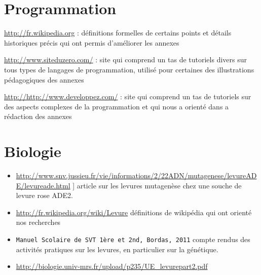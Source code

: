 \label{BibSito}
\section*{Programmation}
  \begin{description}
    \item \url{http://fr.wikipedia.org} : définitions formelles de certains points et détails historiques précis qui ont permis d'améliorer les annexes
    \item \url{http://www.siteduzero.com/} : site qui comprend un tas de tutoriels divers sur tous types de langages de programmation, utilisé pour certaines des illustrations pédagogiques des annexes
    \item \url{http://http://www.developpez.com/} : site qui comprend un tas de tutoriels sur des aspects complexes de la programmation et qui nous a orienté dans a rédaction des annexes
  \end{description}
\section*{Biologie}
  \begin{itemize}
    \item \url{http://www.snv.jussieu.fr/vie/informations/2/22ADN/mutagenese/levureADE/levureade.html}
] article sur les levures mutagenèse chez une souche de levure rose ADE2.
    \item \url{http://fr.wikipedia.org/wiki/Levure} définitions de wikipédia qui ont orienté nos recherches
    \item \texttt{Manuel Scolaire de SVT 1ère et 2nd, Bordas, 2011} compte rendus des activités pratiques sur les levures, en particulier sur la génétique.
    \item \url{http://biologie.univ-mrs.fr/upload/p235/UE_levurepart2.pdf}
  \end{itemize}
